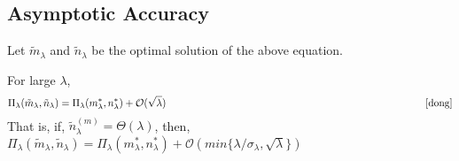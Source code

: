 \subsection{Asymptotic Accuracy}
Let $\tilde{m}_{\lambda}$ and $\tilde{n}_{\lambda}$ be the optimal solution of the above equation. 

\begin{theorem}
For large $\lambda$, 
\[ \Pi_{\lambda}(\tilde{m}_{\lambda},\tilde{n}_{\lambda}) = \Pi_{\lambda}(m_{\lambda}^*,n_{\lambda}^*) + \mathcal{O}(\sqrt{\lambda}) \hspace{9cm}  \cite{dong}\] 
That is, if,  $\tilde{n}_{\lambda}^{(m)}=\Theta(\lambda)$, then, $\Pi_{\lambda}(\tilde{m}_{\lambda},\tilde{n}_{\lambda}) = \Pi_{\lambda}(m_{\lambda}^*,n_{\lambda}^*) + \mathcal{O}(min\{\lambda/\sigma_{\lambda}, \sqrt{\lambda}\})$ 
\end{theorem} 
